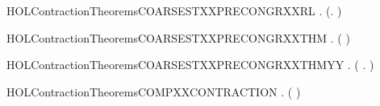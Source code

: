 \newcommand{\HOLContractionTheoremsCOARSESTXXPRECONGRXXLR}{\UseVerbatim{HOLContractionTheoremsCOARSESTXXPRECONGRXXLR}}
\begin{SaveVerbatim}{HOLContractionTheoremsCOARSESTXXPRECONGRXXRL}
\HOLTokenTurnstile{} \HOLSymConst{\HOLTokenForall{}} .
         \HOLSymConst{\HOLTokenConj{}}   \HOLSymConst{\HOLTokenImp{}}
       (\HOLSymConst{\HOLTokenForall{}}.  \HOLSymConst{+}    \HOLSymConst{+} ) \HOLSymConst{\HOLTokenImp{}}
         
\end{SaveVerbatim}
\newcommand{\HOLContractionTheoremsCOARSESTXXPRECONGRXXRL}{\UseVerbatim{HOLContractionTheoremsCOARSESTXXPRECONGRXXRL}}
\begin{SaveVerbatim}{HOLContractionTheoremsCOARSESTXXPRECONGRXXTHM}
\HOLTokenTurnstile{} \HOLSymConst{\HOLTokenForall{}} .
         \HOLSymConst{\HOLTokenConj{}}   \HOLSymConst{\HOLTokenImp{}}
       (   \HOLSymConst{\HOLTokenEquiv{}}   )
\end{SaveVerbatim}
\newcommand{\HOLContractionTheoremsCOARSESTXXPRECONGRXXTHM}{\UseVerbatim{HOLContractionTheoremsCOARSESTXXPRECONGRXXTHM}}
\begin{SaveVerbatim}{HOLContractionTheoremsCOARSESTXXPRECONGRXXTHMYY}
\HOLTokenTurnstile{} \HOLSymConst{\HOLTokenForall{}} .
         \HOLSymConst{\HOLTokenConj{}}   \HOLSymConst{\HOLTokenImp{}}
       (   \HOLSymConst{\HOLTokenEquiv{}} \HOLSymConst{\HOLTokenForall{}}.  \HOLSymConst{+}    \HOLSymConst{+} )
\end{SaveVerbatim}
\newcommand{\HOLContractionTheoremsCOARSESTXXPRECONGRXXTHMYY}{\UseVerbatim{HOLContractionTheoremsCOARSESTXXPRECONGRXXTHMYY}}
\begin{SaveVerbatim}{HOLContractionTheoremsCOMPXXCONTRACTION}
\HOLTokenTurnstile{} \HOLSymConst{\HOLTokenForall{}} .
         \HOLSymConst{\HOLTokenConj{}}   \HOLSymConst{\HOLTokenImp{}}
        (  )
\end{SaveVerbatim}
